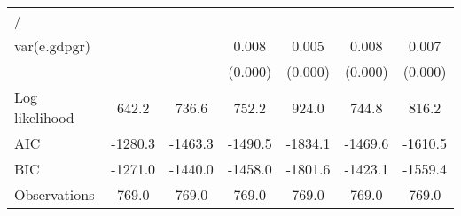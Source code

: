 \begin{table}[htbp]
\begin{tabular}{l*{6}{c}}
\hline
/                   &                     &                     &                     &                     &                     &                     \\
var(e.gdpgr)        &                     &                     &       0.008\sym{***}&       0.005\sym{***}&       0.008\sym{***}&       0.007\sym{***}\\
                    &                     &                     &     (0.000)         &     (0.000)         &     (0.000)         &     (0.000)         \\
\hline
Log likelihood      &       642.2         &       736.6         &       752.2         &       924.0         &       744.8         &       816.2         \\
AIC                 &     -1280.3         &     -1463.3         &     -1490.5         &     -1834.1         &     -1469.6         &     -1610.5         \\
BIC                 &     -1271.0         &     -1440.0         &     -1458.0         &     -1801.6         &     -1423.1         &     -1559.4         \\
Observations        &       769.0         &       769.0         &       769.0         &       769.0         &       769.0         &       769.0         \\
\hline\hline
\end{tabular}
\end{table}

